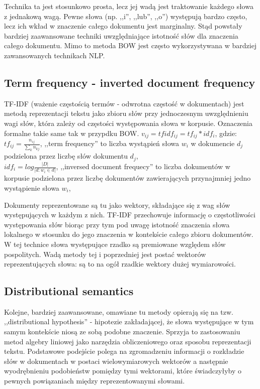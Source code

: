 \documentclass[pl]{minipw} %
\begin{document}
Technika ta jest stosunkowo prosta, lecz jej wadą jest traktowanie każdego słowa z jednakową wagą. Pewne słowa (np. ,,i'', ,,lub'', ,,o'') występują bardzo często, lecz ich wkład w znaczenie całego dokumentu jest marginalny. Stąd powstały bardziej zaawansowane techniki uwzględniające istotność słów dla znaczenia całego dokumentu. Mimo to metoda BOW jest często wykorzystywana w bardziej zawansowanych technikach NLP.
\subsection{Term frequency - inverted document frequency}

TF-IDF\cite{tf_idf} (ważenie częstością termów - odwrotna częstość w dokumentach) jest metodą reprezentacji tekstu jako zbioru słów przy jednoczesnym uwzględnieniu wagi słów, która zależy od częstości występowania słowa w korpusie.  Oznaczenia formalne takie same tak w przypdku BOW.
$v_{ij} = tfidf_{ij} = tf_{ij} * idf_i$, gdzie:\\
$tf_{ij} = \frac{n_{ij}}{\sum\limits_{k}n_{kj}}$, ,,term frequency'' to liczba wystąpień słowa $w_i$ w dokumencie $d_j$ podzielona przez liczbę słów dokumentu $d_j$,\\
$idf_i = log\frac{|D|}{|{d:w_i \in d}|}$, ,,inversed document frequecy'' to liczba dokumentów w korpusie podzielona przez liczbę dokumentów zawierających przynajmniej jedno wystąpienie słowa $w_i$,

Dokumenty reprezentowane są tu jako wektory, składające się z wag słów występujących w każdym z nich. TF-IDF przechowuje informację o częstotliwości występowania słów biorąc przy tym pod uwagę istotność znaczenia słowa lokalnego w stosunku do jego znaczenia w kontekście całego zbioru dokumentów. W tej technice słowa występujące rzadko są premiowane względem słów pospolitych. Wadą metody tej i poprzedniej jest postać wektorów reprezentujących słowa: są to na ogół rzadkie wektory dużej wymiarowości.

\subsection{Distributional semantics}
Kolejne, bardziej zaawansowane, omawiane tu metody opierają się na tzw. ,,distributional hypothesis'' - hipotezie zakładającej, że słowa występujące w tym samym kontekście niosą ze sobą podobne znaczenie\cite{bow}\cite{firth}. Sprzyja to zastosowaniu metod algebry liniowej jako narzędzia obliczeniowego oraz sposobu reprezentacji tekstu. Podstawowe podejście polega na zgromadzeniu informacji o rozkładzie słów w dokumentach w postaci wielowymiarowych wektorów a następnie wyodrębnieniu podobieństw pomiędzy tymi wektorami, które świadczyłyby o pewnych powiązaniach między reprezentowanymi słowami. 
\end{document}
